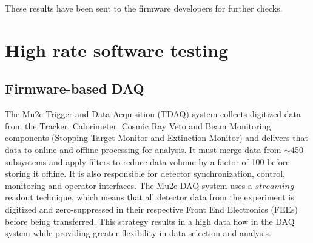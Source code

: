 These results have been sent to the firmware developers for further checks.



















\section{High rate software testing}
\subsection{Firmware-based DAQ}
The Mu2e Trigger and Data Acquisition (TDAQ) system collects digitized data from the Tracker, 
Calorimeter, Cosmic Ray Veto and Beam Monitoring components (Stopping Target Monitor and Extinction Monitor) 
and delivers that data to online and offline processing for analysis. It must merge data from $\sim$450 subsystems 
and apply filters to reduce data volume by a factor of 100 before storing it offline. It is also responsible for 
detector synchronization, control, monitoring and operator interfaces. The Mu2e DAQ system uses a $streaming$ readout technique, 
which means that all detector data from the experiment is digitized and zero-suppressed in their respective Front End Electronics 
(FEEs) before being transferred. This strategy results in a high data flow in the DAQ system while providing greater flexibility in data selection and analysis.
